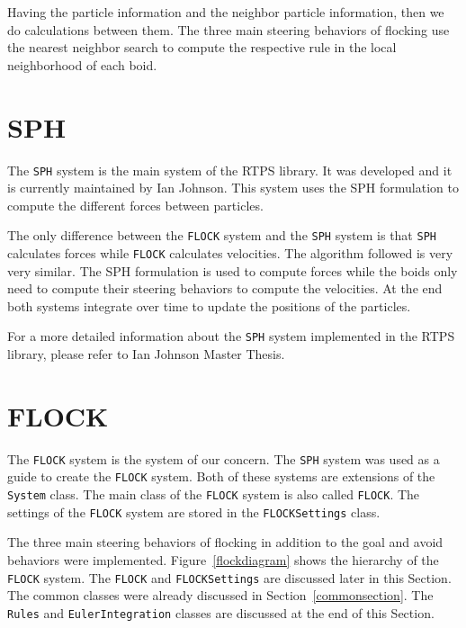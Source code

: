 Having the particle information and the neighbor particle information, then we do calculations between them. The three main steering behaviors of flocking use the nearest neighbor search to compute the respective rule in the local neighborhood of each boid.

\section{SPH}\label{sphsection}
The \texttt{SPH} system is the main system of the RTPS library. It was developed and it is currently maintained by Ian Johnson\cite{ianBlog}\cite{ianPaper}. This system uses the SPH formulation to compute the different forces between particles.

The only difference between the \texttt{FLOCK} system and the \texttt{SPH} system is that \texttt{SPH} calculates forces while \texttt{FLOCK} calculates velocities. The algorithm followed is very very similar. The SPH formulation is used to compute forces while the boids only need to compute their steering behaviors to compute the velocities. At the end both systems integrate over time to update the positions of the particles.

For a more detailed information about the \texttt{SPH} system implemented in the RTPS library, please refer to Ian Johnson Master Thesis\cite{ianThesis}.

\section{FLOCK}\label{flocksection}
The \texttt{FLOCK} system is the system of our concern. The \texttt{SPH} system was used as a guide to create the \texttt{FLOCK} system. Both of these systems are extensions of  the \texttt{System} class. The main class of the \texttt{FLOCK} system is also called \texttt{FLOCK}. The settings of the \texttt{FLOCK} system are stored in the \texttt{FLOCKSettings} class. 

The three main steering behaviors of flocking in addition to the goal and avoid behaviors were implemented. Figure~\ref{flockdiagram} shows the hierarchy of the \texttt{FLOCK} system. The \texttt{FLOCK} and \texttt{FLOCKSettings} are discussed later in this Section. The common classes were already discussed in Section~\ref{commonsection}. The \texttt{Rules} and \texttt{EulerIntegration} classes are discussed at the end of this Section.

